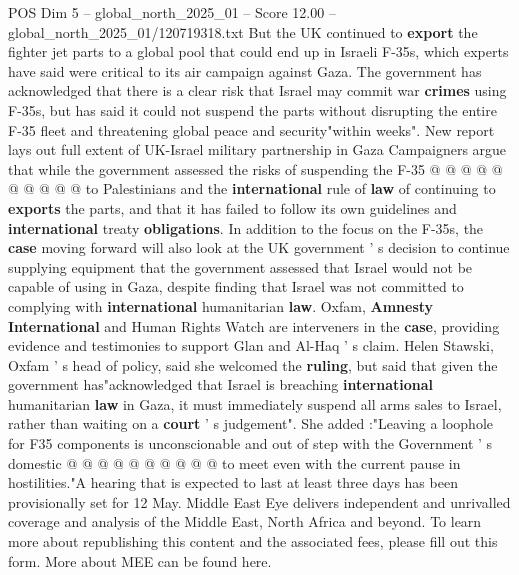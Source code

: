 \begin{textsample}{POS Dim 5 – global\_north\_2025\_01 – Score 12.00 – global\_north\_2025\_01/120719318.txt}
But the UK continued to \textbf{export} the fighter jet parts to a global pool that could end up in Israeli F-35s, which experts have said were critical to its air campaign against Gaza.
The government has acknowledged that there is a clear risk that Israel may commit war \textbf{crimes} using F-35s, but has said it could not suspend the parts without disrupting the entire F-35 fleet and threatening global peace and security"within weeks".
New report lays out full extent of UK-Israel military partnership in Gaza Campaigners argue that while the government assessed the risks of suspending the F-35 @ @ @ @ @ @ @ @ @ @ to Palestinians and the \textbf{international} rule of \textbf{law} of continuing to \textbf{exports} the parts, and that it has failed to follow its own guidelines and \textbf{international} treaty \textbf{obligations}.
In addition to the focus on the F-35s, the \textbf{case} moving forward will also look at the UK government ' s decision to continue supplying equipment that the government assessed that Israel would not be capable of using in Gaza, despite finding that Israel was not committed to complying with \textbf{international} humanitarian \textbf{law}.
Oxfam, \textbf{Amnesty} \textbf{International} and Human Rights Watch are interveners in the \textbf{case}, providing evidence and testimonies to support Glan and Al-Haq ' s claim.
Helen Stawski, Oxfam ' s head of policy, said she welcomed the \textbf{ruling}, but said that given the government has"acknowledged that Israel is breaching \textbf{international} humanitarian \textbf{law} in Gaza, it must immediately suspend all arms sales to Israel, rather than waiting on a \textbf{court} ' s judgement".
She added :"Leaving a loophole for F35 components is unconscionable and out of step with the Government ' s domestic @ @ @ @ @ @ @ @ @ @ to meet even with the current pause in hostilities."A hearing that is expected to last at least three days has been provisionally set for 12 May.
Middle East Eye delivers independent and unrivalled coverage and analysis of the Middle East, North Africa and beyond.
To learn more about republishing this content and the associated fees, please fill out this form.
More about MEE can be found here.

\end{textsample}
